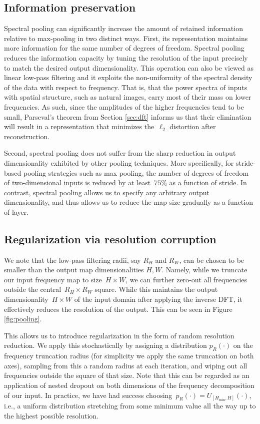 \documentclass{article} %
\begin{document}
\subsection{Information preservation}
\label{sec:info_pres}
Spectral pooling can significantly increase the amount of retained information relative to max-pooling in two distinct ways. First, its representation maintains more information for the same number of degrees of freedom. Spectral pooling reduces the information capacity by tuning the resolution of the input precisely to match the desired output dimensionality. This operation can also be viewed as linear low-pass filtering and it exploits the non-uniformity of the spectral density of the data with respect to frequency. That is, that the power spectra of inputs with spatial structure, such as natural images, carry most of their mass on lower frequencies. As such, since the amplitudes of the higher frequencies tend to be small, Parseval's theorem from Section \ref{sec:dft} informs us that their elimination will result in a representation that minimizes the~$\ell_2$ distortion after reconstruction.

Second, spectral pooling does not suffer from the sharp reduction in output dimensionality exhibited by other pooling techniques. More specifically, for stride-based pooling strategies such as max pooling, the number of degrees of freedom of two-dimensional inputs is reduced by at least~$75\%$ as a function of stride. In contrast, spectral pooling allows us to specify any arbitrary output dimensionality, and thus allows us to reduce the map size gradually as a function of layer. 


\subsection{Regularization via resolution corruption}
We note that the low-pass filtering radii, say $R_H$ and $R_W$, can be chosen to be smaller than the output map dimensionalities $H, W$. Namely, while we truncate our input frequency map to size~${H\times W}$, we can further zero-out all frequencies outside the central~${R_H\times R_W}$ square. While this maintains the output dimensionality~${H\times W}$ of the input domain after applying the inverse DFT, it effectively reduces the resolution of the output. This can be seen in Figure \ref{fig:pooling}.

This allows us to introduce regularization in the form of random resolution reduction. We apply this stochastically by assigning a distribution $p_R(\cdot)$ on the frequency truncation radius (for simplicity we apply the same truncation on both axes), sampling from this a random radius at each iteration, and wiping out all frequencies outside the square of that size. Note that this can be regarded as an application of nested dropout \citep{rippel_2014} on both dimensions of the frequency decomposition of our input. In practice, we have had success choosing~${p_R(\cdot)=U_{[H_{\textrm{min}}, H]}(\cdot)}$, i.e., a uniform distribution stretching from some minimum value all the way up to the highest possible resolution. 
\end{document}
